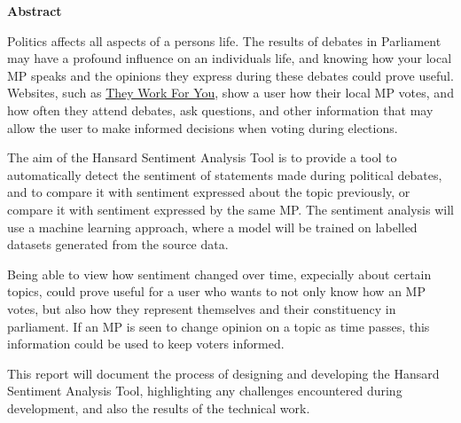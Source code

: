 \thispagestyle{empty}

\begin{center}
    {\LARGE\bf Abstract}
\end{center}

Politics affects all aspects of a persons life. The results of debates in Parliament may have a profound influence on an individuals life, and knowing how your local MP speaks and the opinions they express during these debates could prove useful. Websites, such as \href{https://www.theyworkforyou.com}{They Work For You}, show a user how their local MP votes, and how often they attend debates, ask questions, and other information that may allow the user to make informed decisions when voting during elections.

The aim of the Hansard Sentiment Analysis Tool is to provide a tool to automatically detect the sentiment of statements made during political debates, and to compare it with sentiment expressed about the topic previously, or compare it with sentiment expressed by the same MP. The sentiment analysis will use a machine learning approach, where a model will be trained on labelled datasets generated from the source data.

Being able to view how sentiment changed over time, expecially about certain topics, could prove useful for a user who wants to not only know how an MP votes, but also how they represent themselves and their constituency in parliament. If an MP is seen to change opinion on a topic as time passes, this information could be used to keep voters informed.

This report will document the process of designing and developing the Hansard Sentiment Analysis Tool, highlighting any challenges encountered during development, and also the results of the technical work.
